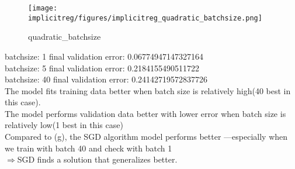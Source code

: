 
\begin{answer}
\begin{figure}[H]
  \centering
  \texttt{[image: implicitreg/figures/implicitreg\_quadratic\_batchsize.png]}
  \caption{quadratic_batchsize}
\end{figure}
batchsize:  1 final validation error:  0.06774947147327164\\
batchsize:  5 final validation error:  0.2184155490511722\\
batchsize:  40 final validation error:  0.24142719572837726\\
The model fits training data better when batch size is relatively high(40 best in this case).\\
The model performs validation data better with lower error when batch size is relatively low(1 best in this case)\\
Compared to (g), the SGD algorithm model performs better —especially when we train with batch 40 and check with batch 1\\
\(\Longrightarrow\)SGD finds a solution that generalizes better.
\end{answer}